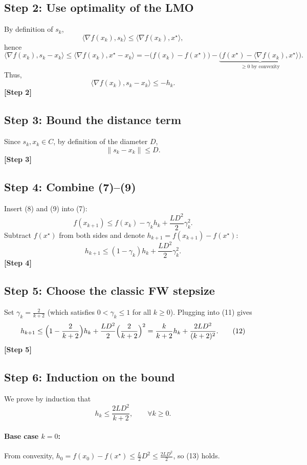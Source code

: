 \documentclass{article}
\begin{document}
\subsection*{Step 2: Use optimality of the LMO}
By definition of $s_k$,
\[
\langle\nabla f(x_k),s_k\rangle \le \langle\nabla f(x_k),x^\star\rangle,
\]
hence
\[
\langle\nabla f(x_k),s_k-x_k\rangle
\le \langle\nabla f(x_k),x^\star-x_k\rangle
= -\bigl(f(x_k)-f(x^\star)\bigr) -\underbrace{\bigl(f(x^\star)-\langle\nabla f(x_k),x^\star\rangle\bigr)}_{\ge 0\text{ by convexity}}.
\]
Thus,
\[
\langle\nabla f(x_k),s_k-x_k\rangle \le -h_k . \tag{8}
\]
\textbf{[Step 2]}

\subsection*{Step 3: Bound the distance term}
Since $s_k,x_k\in C$, by definition of the diameter $D$,
\[
\|s_k-x_k\|\le D . \tag{9}
\]
\textbf{[Step 3]}

\subsection*{Step 4: Combine (7)–(9)}
Insert (8) and (9) into (7):
\[
f(x_{k+1}) \le f(x_k) -\gamma_k h_k + \frac{L D^{2}}{2}\gamma_k^{2}. \tag{10}
\]
Subtract $f(x^\star)$ from both sides and denote $h_{k+1}=f(x_{k+1})-f(x^\star)$:
\[
h_{k+1} \le (1-\gamma_k)h_k + \frac{L D^{2}}{2}\gamma_k^{2}. \tag{11}
\]
\textbf{[Step 4]}

\subsection*{Step 5: Choose the classic FW stepsize}
Set $\displaystyle\gamma_k=\frac{2}{k+2}$ (which satisfies $0<\gamma_k\le1$ for all $k\ge0$).  
Plugging into (11) gives
\[
h_{k+1} \le \Bigl(1-\frac{2}{k+2}\Bigr)h_k + \frac{L D^{2}}{2}\Bigl(\frac{2}{k+2}\Bigr)^{2}
= \frac{k}{k+2}h_k + \frac{2L D^{2}}{(k+2)^{2}}. \tag{12}
\]
\textbf{[Step 5]}

\subsection*{Step 6: Induction on the bound}
We prove by induction that
\[
h_k \le \frac{2L D^{2}}{k+2},\qquad\forall k\ge0. \tag{13}
\]

\paragraph{Base case $k=0$:}  
From convexity, $h_0 = f(x_0)-f(x^\star) \le \frac{L}{2}D^{2}\le \frac{2L D^{2}}{2}$, so (13) holds.
\end{document}
